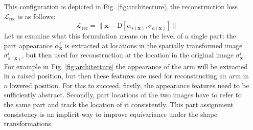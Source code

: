 	This configuration is depicted in Fig. \ref{fig:architecture}, the reconstruction loss $\mathcal{L}_{\textrm{rec}}$ is as follows:
	\begin{equation}\label{eq:loss_rec}
		\mathcal{L}_{\textrm{rec}}= \lVert  \mathbf{x}  - \mathrm{D}[{\alpha}_{s(\mathbf{x})}, {\sigma}_{a(\mathbf{x})}]\rVert
	\end{equation}
	Let us examine what this formulation means on the level of a single part: the part appearance $\alpha^i_{\mathbf{x}}$ is extracted at locations in the spatially transformed image ${\sigma}^i_{s(\mathbf{x})}$, but then used for reconstruction at the location in the original image ${\sigma}^i_{\mathbf{x}}$. For example in Fig.  \ref{fig:architecture} the appearance of the arm will be extracted in a raised position, but then these features are used for reconstructing an arm in a lowered position. For this to succeed, firstly, the appearance features need to be sufficiently abstract. Secondly, part locations of the two images have to refer to the same part and track the location of it consistently. This part assignment consistency is an implicit way to improve equivariance under the shape transformations.\\
